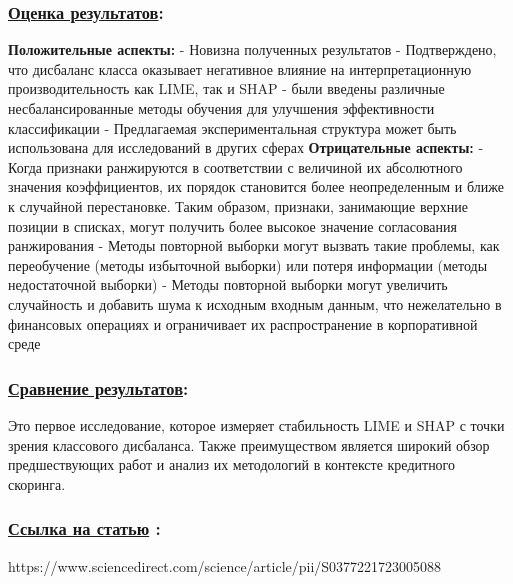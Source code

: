 \documentclass[a4paper,14pt]{article}
\begin{document}
\subsubsection*{\underline{Оценка результатов}:}
\textbf{Положительные аспекты:} \newline
- Новизна полученных результатов \newline
- Подтверждено, что дисбаланс класса оказывает негативное влияние на интерпретационную производительность как LIME, так и SHAP \newline
- были введены различные несбалансированные методы обучения для улучшения эффективности классификации \newline 
- Предлагаемая экспериментальная структура может быть использована для исследований в других сферах \vspace{10pt} \newline 
\textbf{Отрицательные аспекты:} \newline
- Когда признаки ранжируются в соответствии с величиной их абсолютного значения \newline коэффициентов, их порядок становится более неопределенным и ближе к случайной \newline перестановке. Таким образом, признаки, занимающие верхние позиции в списках, могут \newline получить более высокое значение согласования ранжирования  \newline
- Методы повторной выборки могут вызвать такие проблемы, как переобучение (методы  \newline избыточной выборки) или потеря информации (методы недостаточной выборки)  \newline
- Методы повторной выборки могут увеличить случайность и добавить шума к исходным входным данным, что нежелательно в финансовых операциях и ограничивает их  \newline распространение в корпоративной среде  \newline

\subsubsection*{\underline{Сравнение результатов}:}
Это первое исследование, которое измеряет стабильность LIME и SHAP с точки зрения классового дисбаланса. Также преимуществом является широкий обзор предшествующих работ и анализ их методологий в контексте кредитного скоринга.

\subsubsection*{\underline{Ссылка на статью} :}
https://www.sciencedirect.com/science/article/pii/S0377221723005088
\end{document}
